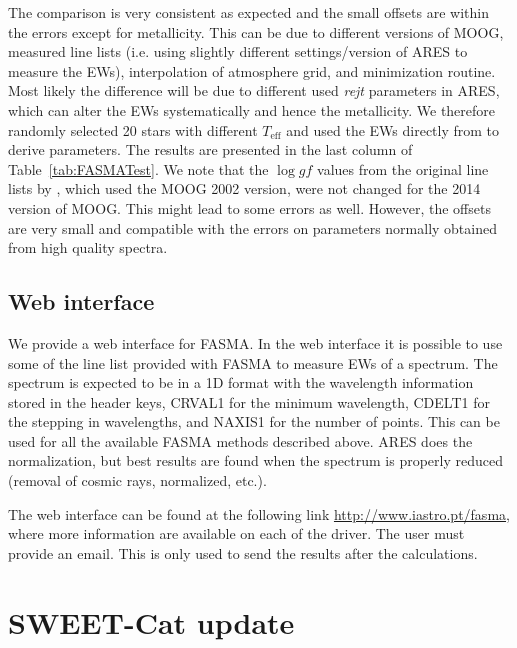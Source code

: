 \documentclass{aa}
\begin{document}
The comparison is very consistent as expected and the small offsets are within
the errors except for metallicity. This can be due to different versions of
MOOG, measured line lists (i.e. using slightly different settings/version of
ARES to measure the EWs), interpolation of atmosphere grid, and minimization
routine. Most likely the difference will be due to different used \emph{rejt}
parameters in ARES, which can alter the EWs systematically and hence the
metallicity. We therefore randomly selected 20 stars with different
$T_\mathrm{eff}$ and used the EWs directly from \citet{Sousa2011} to derive
parameters. The results are presented in the last column of
Table~\ref{tab:FASMATest}. We note that the $\log gf$ values from the original
line lists by \citet{Sousa2011}, which used the MOOG 2002 version, were not
changed for the 2014 version of MOOG. This might lead to some errors as well.
However, the offsets are very small and compatible with the errors on parameters
normally obtained from high quality spectra.


\subsection{Web interface}
\label{sub:Web interface}

We provide a web interface for FASMA. In the web interface it is possible to use
some of the line list provided with FASMA to measure EWs of a spectrum. The
spectrum is expected to be in a 1D format with the wavelength information stored
in the header keys, CRVAL1 for the minimum wavelength, CDELT1 for the stepping
in wavelengths, and NAXIS1 for the number of points. This can be used for all
the available FASMA methods described above. ARES does the normalization, but
best results are found when the spectrum is properly reduced (removal of cosmic
rays, normalized, etc.).

The web interface can be found at the following link
\url{http://www.iastro.pt/fasma}, where more information are available on each
of the driver. The user must provide an email. This is only used to send the
results after the calculations.


\section{SWEET-Cat update}
\end{document}

